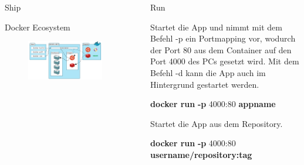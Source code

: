 \documentclass[final]{beamer}
\newlength{\sepwid}
\newlength{\specialcolwid}
\begin{document}
\begin{frame}
\begin{columns}[t]
\begin{column}{\specialcolwid}
\begin{block}{Ship}
\begin{center}
\vspace{2cm}
Docker Ecosystem
\end{center}
\begin{figure}
\includegraphics[scale=1.0]{eco}
\end{figure}



\end{block}

\end{column} %

\begin{column}{\sepwid}\end{column} %

\begin{column}{\specialcolwid} %

\begin{block}{Run}

\par Startet die App und nimmt mit dem Befehl -p ein Portmapping vor, wodurch der Port 80 aus dem Container auf den Port 4000 des PCs gesetzt wird. Mit dem Befehl -d kann die App auch im Hintergrund gestartet werden.
\par \textbf{docker run} \textcolor{docker-pu}{\textbf{-p}} 4000:80 \textcolor{docker-lb}{\textbf{appname}}

\vspace{1cm}
\par Startet die App aus dem Repository.
\par \par \textbf{docker run} \textcolor{docker-pu}{\textbf{-p}} 4000:80 \textcolor{docker-lb}{\textbf{username/repository:tag}}

\end{block}


\end{column}
\end{columns}
\end{frame}
\end{document}
